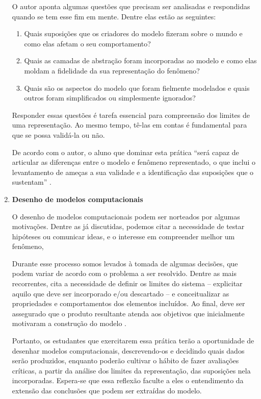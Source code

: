 \begin{enumerate}
  O autor aponta algumas questões que precisam ser analisadas e respondidas quando se tem esse fim em mente. Dentre elas estão as seguintes:

  \begin{enumerate}
    \item Quais suposições que os criadores do modelo fizeram sobre o mundo e como elas afetam o seu comportamento?
    \item Quais as camadas de abstração foram incorporadas ao modelo e como elas moldam a fidelidade da sua representação do fenômeno?
    \item Quais são os aspectos do modelo que foram fielmente modelados e quais outros foram simplificados ou simplesmente ignorados?
  \end{enumerate}

  Responder essas questões é tarefa essencial para compreensão dos limites de uma representação. Ao mesmo tempo, tê-las em contas é fundamental para que se possa validá-la ou não.

  De acordo com o autor, o aluno que dominar esta prática ``será capaz de articular as diferenças entre o modelo e fenômeno representado, o que inclui o levantamento de ameças a sua validade e a identificação das suposições que o sustentam'' \cite{Weintrop2016}.

  \item \textbf{Desenho de modelos computacionais}

  O desenho de modelos computacionais podem ser norteados por algumas motivações. Dentre as já discutidas, podemos citar a necessidade de testar hipóteses ou comunicar ideas, e o interesse em compreender melhor um fenômeno, 

  Durante esse processo somos levados à tomada de algumas decisões, que podem variar de acordo com o problema a ser resolvido. Dentre as mais recorrentes,  cita a necessidade de definir os limites do sistema -- explicitar aquilo que deve ser incorporado e/ou descartado -- e conceitualizar as propriedades e comportamentos dos elementos incluídos. Ao final, deve ser assegurado que o produto resultante atenda aos objetivos que inicialmente motivaram a construção do modelo \cite{Weintrop2016}.

  Portanto, os estudantes que exercitarem essa prática terão a oportunidade de desenhar modelos computacionais, descrevendo-os e decidindo quais dados serão produzidos, enquanto poderão cultivar o hábito de fazer avaliações críticas, a partir da análise dos limites da representação, das suposições nela incorporadas. Espera-se que essa reflexão faculte a eles o entendimento da extensão das conclusões que podem ser extraídas do modelo.


\end{enumerate}
